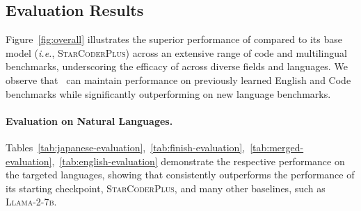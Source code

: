 \subsection{Evaluation Results}

Figure~\ref{fig:overall} illustrates the superior performance of {\system} compared to its base model (\emph{i.e.}, \textsc{StarCoderPlus}) across an extensive range of code and multilingual benchmarks, underscoring the efficacy of {\system} across diverse fields and languages. We observe that \system\ can maintain performance on previously learned English and Code benchmarks while significantly outperforming on new language benchmarks. 





\paragraph{Evaluation on Natural Languages.}

Tables~\ref{tab:japanese-evaluation},~\ref{tab:finish-evaluation},~\ref{tab:merged-evaluation},~\ref{tab:english-evaluation} demonstrate the respective performance on the targeted languages, showing that {\system} consistently outperforms the performance of its starting checkpoint, \textsc{StarCoderPlus}, and many other baselines, such as \textsc{Llama-2-7b}.  %


